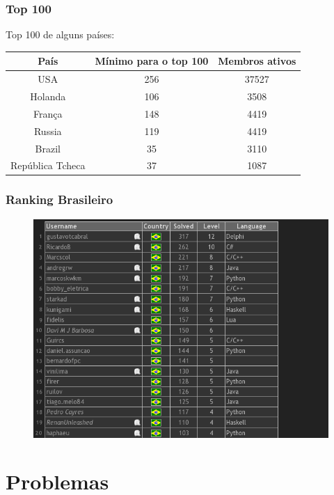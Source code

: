 \documentclass{beamer}
\begin{document}
\begin{frame}
    \frametitle{Top 100}

    Top 100 de alguns países:

    \begin{table}[htpb]
        \centering
        \begin{tabular}{c c c}
            País             & Mínimo para o top 100 & Membros ativos \\ \hline \hline
            USA              & 256                   & 37527 \\
            Holanda          & 106                   & 3508 \\
            França           & 148                   & 4419 \\
            Russia           & 119                   & 4419 \\
            Brazil           & 35                    & 3110 \\
            República Tcheca & 37                    & 1087 \\
        \end{tabular}
    \end{table}
\end{frame}

\begin{frame}
    \frametitle{Ranking Brasileiro}
\begin{figure}[htpb]
    \centering
    \includegraphics[width=0.8\linewidth]{images/top20_br.png}
\end{figure}
\end{frame}

\section{Problemas}
\end{document}
